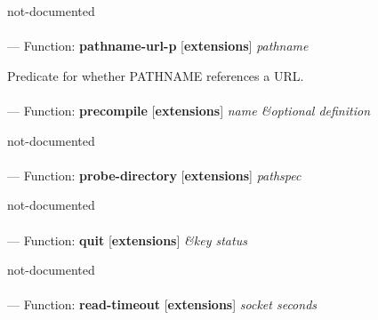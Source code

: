 \begin{adjustwidth}{5em}{5em}
not-documented
\end{adjustwidth}

\paragraph{}
\label{EXTENSIONS:PATHNAME-URL-P}
--- Function: \textbf{pathname-url-p} [\textbf{extensions}] \textit{pathname}

\begin{adjustwidth}{5em}{5em}
Predicate for whether PATHNAME references a URL.
\end{adjustwidth}

\paragraph{}
\label{EXTENSIONS:PRECOMPILE}
--- Function: \textbf{precompile} [\textbf{extensions}] \textit{name \&optional definition}

\begin{adjustwidth}{5em}{5em}
not-documented
\end{adjustwidth}

\paragraph{}
\label{EXTENSIONS:PROBE-DIRECTORY}
--- Function: \textbf{probe-directory} [\textbf{extensions}] \textit{pathspec}

\begin{adjustwidth}{5em}{5em}
not-documented
\end{adjustwidth}

\paragraph{}
\label{EXTENSIONS:QUIT}
--- Function: \textbf{quit} [\textbf{extensions}] \textit{\&key status}

\begin{adjustwidth}{5em}{5em}
not-documented
\end{adjustwidth}

\paragraph{}
\label{EXTENSIONS:READ-TIMEOUT}
--- Function: \textbf{read-timeout} [\textbf{extensions}] \textit{socket seconds}

